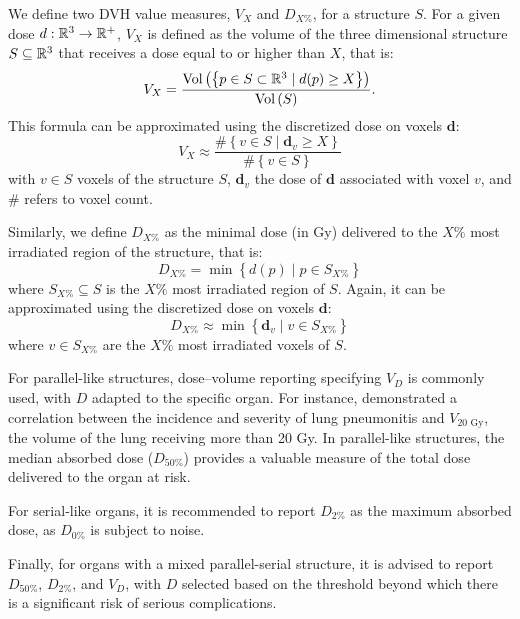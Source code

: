We define two DVH value measures, $V_X$ and $D_{X\%}$, for a structure $S$.
For a given dose $d: \mathbb{R}^3 \to \mathbb{R}^+$, $V_X$ is defined as the volume of the three dimensional structure $S \subseteq \mathbb{R}^3$ that receives a dose equal to or higher than $X$, that is:
$$ V_X = \frac{\text{Vol} \left( {\left\lbrace p \in S \subset \mathbb{R}^3 \mid d(p) \geq X \right\rbrace} \right)}{\text{Vol} \left( {S} \right)}.$$
This formula can be approximated using the discretized dose on voxels $\mathbf{d}$:
$$ V_X \approx \frac{ \#{\left\lbrace v \in S \mid \mathbf{d}_v \geq X \right\rbrace}}{\#\left\{ v \in S \right\}}$$
with $v \in S$ voxels of the structure $S$, $\mathbf{d}_v$ the dose of $\mathbf{d}$ associated with voxel $v$, and $\#$ refers to voxel count.

Similarly, we define $D_{X\%}$ as the minimal dose (in Gy) delivered to the $X\%$ most irradiated region of the structure, that is:
$$D_{X\%} = \min \left\lbrace d(p) \mid p \in S_{X\%} \right\rbrace$$
where $S_{X\%} \subseteq S$ is the $X\%$ most irradiated region of $S$.
Again, it can be approximated using the discretized dose on voxels $\mathbf{d}$:
$$D_{X\%} \approx \min \left\lbrace \mathbf{d}_v \mid v \in S_{X\%} \right\rbrace$$
where $v \in S_{X\%}$ are the $X\%$ most irradiated voxels of $S$.

For parallel-like structures, dose–volume reporting specifying $V_D$ is commonly used, with $D$ adapted to the specific organ.
For instance, \cite{Graham1995} demonstrated a correlation between the incidence and severity of lung pneumonitis and $V_{20 \text{ Gy}}$, the volume of the lung receiving more than 20 Gy.
In parallel-like structures, the median absorbed dose ($D_{50\%}$) provides a valuable measure of the total dose delivered to the organ at risk.

For serial-like organs, it is recommended to report $D_{2\%}$ as the maximum absorbed dose, as $D_{0\%}$ is subject to noise.

Finally, for organs with a mixed parallel-serial structure, it is advised to report $D_{50\%}$, $D_{2\%}$, and $V_D$, with $D$ selected based on the threshold beyond which there is a significant risk of serious complications.

